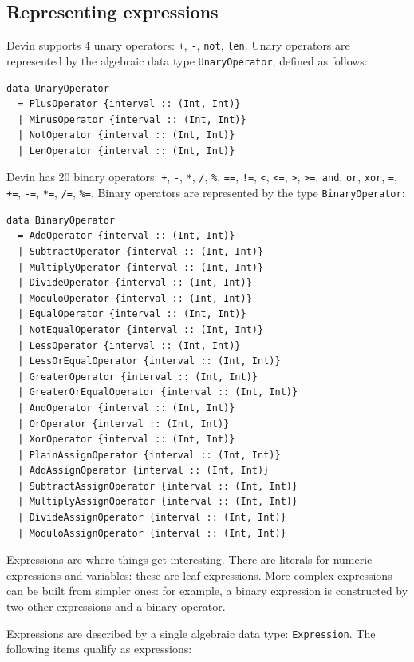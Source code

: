 \documentclass[11pt, american, draft]{PhdThesis}
\begin{document}
  \subsection{Representing expressions}

  Devin supports 4 unary operators: \verb$+$, \verb$-$, \verb$not$, \verb$len$. Unary operators are
  represented by the algebraic data type \verb$UnaryOperator$, defined as follows:

\begin{verbatim}
data UnaryOperator
  = PlusOperator {interval :: (Int, Int)}
  | MinusOperator {interval :: (Int, Int)}
  | NotOperator {interval :: (Int, Int)}
  | LenOperator {interval :: (Int, Int)}
\end{verbatim}

  Devin has 20 binary operators: \verb$+$, \verb$-$, \verb$*$, \verb$/$, \verb$%$, \verb$==$,
  \verb$!=$, \verb$<$, \verb$<=$, \verb$>$, \verb$>=$, \verb$and$, \verb$or$, \verb$xor$, \verb$=$,
  \verb$+=$, \verb$-=$, \verb$*=$, \verb$/=$, \verb$%=$. Binary operators are represented by the
  type \verb$BinaryOperator$:

\begin{verbatim}
data BinaryOperator
  = AddOperator {interval :: (Int, Int)}
  | SubtractOperator {interval :: (Int, Int)}
  | MultiplyOperator {interval :: (Int, Int)}
  | DivideOperator {interval :: (Int, Int)}
  | ModuloOperator {interval :: (Int, Int)}
  | EqualOperator {interval :: (Int, Int)}
  | NotEqualOperator {interval :: (Int, Int)}
  | LessOperator {interval :: (Int, Int)}
  | LessOrEqualOperator {interval :: (Int, Int)}
  | GreaterOperator {interval :: (Int, Int)}
  | GreaterOrEqualOperator {interval :: (Int, Int)}
  | AndOperator {interval :: (Int, Int)}
  | OrOperator {interval :: (Int, Int)}
  | XorOperator {interval :: (Int, Int)}
  | PlainAssignOperator {interval :: (Int, Int)}
  | AddAssignOperator {interval :: (Int, Int)}
  | SubtractAssignOperator {interval :: (Int, Int)}
  | MultiplyAssignOperator {interval :: (Int, Int)}
  | DivideAssignOperator {interval :: (Int, Int)}
  | ModuloAssignOperator {interval :: (Int, Int)}
\end{verbatim}

  Expressions are where things get interesting. There are literals for numeric expressions and
  variables: these are leaf expressions. More complex expressions can be built from simpler ones:
  for example, a binary expression is constructed by two other expressions and a binary operator.

  Expressions are described by a single algebraic data type: \verb$Expression$. The following items
  qualify as expressions:
\end{document}
